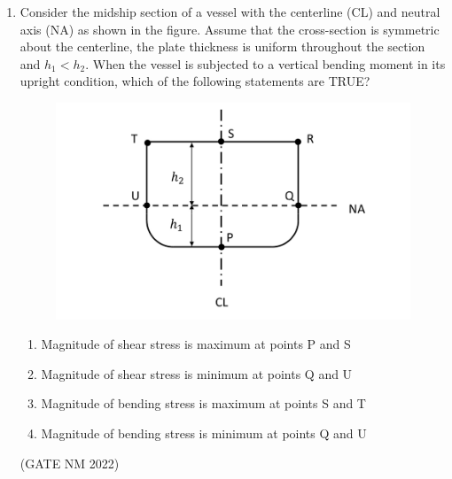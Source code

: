 \documentclass[journal,12pt,onecolumn]{IEEEtran}
\theoremstyle{remark}
\begin{document}
\begin{enumerate}
\item  Consider the midship section of a vessel with the centerline (CL) and neutral axis (NA) as shown in the figure.  
Assume that the cross-section is symmetric about the centerline, the plate thickness is uniform throughout the section and $h_1 < h_2$.  
When the vessel is subjected to a vertical bending moment in its upright condition, which of the following statements are TRUE?
\begin{figure}[h]
	\centering
	\includegraphics[width=0.3\columnwidth]{fig7}
	\caption{}
	\label{fig:placeholder}
\end{figure}
\begin{enumerate}
    \item Magnitude of shear stress is maximum at points P and S
    \item Magnitude of shear stress is minimum at points Q and U
    \item Magnitude of
	    bending stress is maximum at points S and T
    \item Magnitude of bending stress is minimum at points Q and U
\end{enumerate}

\hfill(GATE NM 2022)


\end{enumerate}
\end{document}
